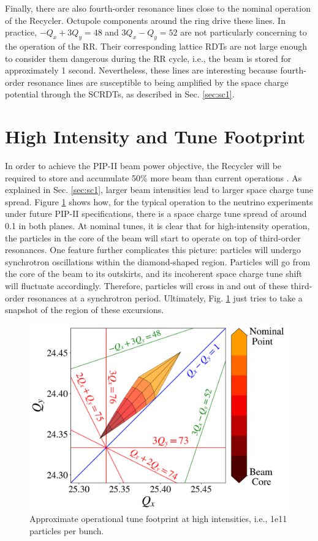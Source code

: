 Finally, there are also fourth-order resonance lines close to the nominal operation of the Recycler. Octupole components around the ring drive these lines. In practice, $-Q_x+3Q_y = 48$ and $3Q_x-Q_y = 52$ are not particularly concerning to the operation of the RR. Their corresponding lattice RDTs are not large enough to consider them dangerous during the RR cycle, i.e., the beam is stored for approximately 1 second. Nevertheless, these lines are interesting because fourth-order resonance lines are susceptible to being amplified by the space charge potential through the SCRDTs, as described in Sec. \ref{sec:sc1}.    

\section{High Intensity and Tune Footprint}

In order to achieve the PIP-II beam power objective, the Recycler will be required to store and accumulate 50\% more beam than current operations \cite{pipII1}. As explained in Sec. \ref{sec:sc1}, larger beam intensities lead to larger space charge tune spread. Figure \ref{fig:rrtdhigh} shows how, for the typical operation to the neutrino experiments under future PIP-II specifications, there is a space charge tune spread of around 0.1 in both planes. At nominal tunes, it is clear that for high-intensity operation, the particles in the core of the beam will start to operate on top of third-order resonances. One feature further complicates this picture: particles will undergo synchrotron oscillations within the diamond-shaped region. Particles will go from the core of the beam to its outskirts, and its incoherent space charge tune shift will fluctuate accordingly. Therefore, particles will cross in and out of these third-order resonances at a synchrotron period. Ultimately, Fig. \ref{fig:rrtdhigh} just tries to take a snapshot of the region of these excursions.  

\begin{figure}[H]
   \centering
   \includegraphics[width=\columnwidth]{chapter3/rrtdhigh.png}
   \caption{Approximate operational tune footprint at high intensities, i.e., 1e11 particles per bunch.}
   \label{fig:rrtdhigh}
\end{figure}

